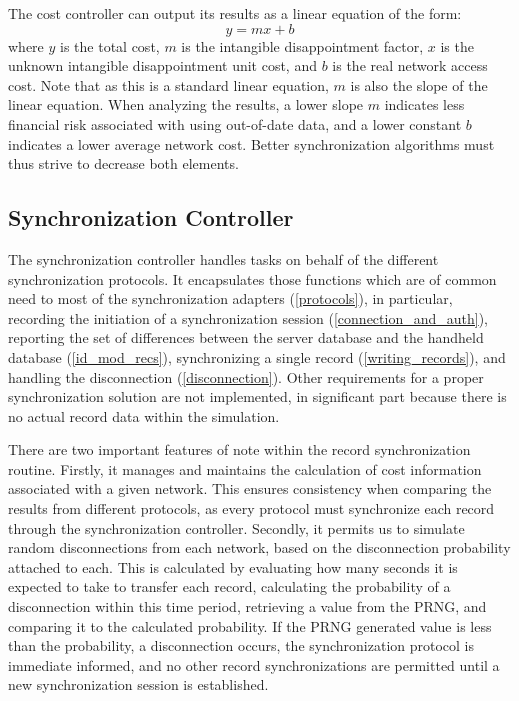 The cost controller can output its results as a linear equation of the form:
\begin{equation}
y=mx+b\label{lineareq}
\end{equation}
where $y$ is the total cost, $m$ is the intangible disappointment factor, $x$ is the unknown intangible disappointment unit cost, and $b$ is the real network access cost.  Note that as this is a standard linear equation, $m$ is also the slope of the linear equation.  When analyzing the results, a lower slope $m$ indicates less financial risk associated with using out-of-date data, and a lower constant $b$ indicates a lower average network cost.  Better synchronization algorithms must thus strive to decrease both elements.

\subsection{Synchronization Controller}\label{synccontroller}

The synchronization controller handles tasks on behalf of the different synchronization protocols.  It encapsulates those functions which are of common need to most of the synchronization adapters (\ref{protocols}), in particular, recording the initiation of a synchronization session (\ref{connection_and_auth}), reporting the set of differences between the server database and the handheld database (\ref{id_mod_recs}), synchronizing a single record (\ref{writing_records}), and handling the disconnection (\ref{disconnection}).  Other requirements for a proper synchronization solution are not implemented, in significant part because there is no actual record data within the simulation.

There are two important features of note within the record synchronization routine.  Firstly, it manages and maintains the calculation of cost information associated with a given network.  This ensures consistency when comparing the results from different protocols, as every protocol must synchronize each record through the synchronization controller.  Secondly, it permits us to simulate random disconnections from each network, based on the disconnection probability attached to each.  This is calculated by evaluating how many seconds it is expected to take to transfer each record, calculating the probability of a disconnection within this time period, retrieving a value from the PRNG, and comparing it to the calculated probability.  If the PRNG generated value is less than the probability, a disconnection occurs, the synchronization protocol is immediate informed, and no other record synchronizations are permitted until a new synchronization session is established.

